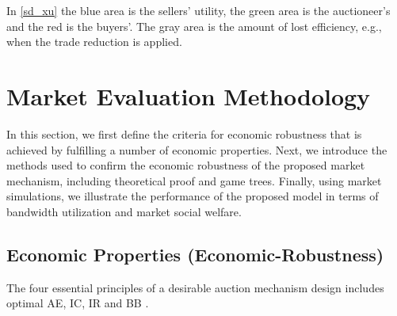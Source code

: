 \begin{enumerate}
In \autoref{sd_xu} the blue area is the sellers' utility, the green area is the auctioneer's and the red is the buyers'. The gray area is the amount of lost efficiency, e.g., when the trade reduction is applied.
\end{enumerate}






\section{Market Evaluation Methodology}
\label{sec:Auc:methodology}
In this section, we first define the criteria for economic robustness that is achieved by fulfilling a number of economic properties. Next, we introduce the methods used to confirm the economic robustness of the proposed market mechanism, including theoretical proof and game trees. Finally, using market simulations, we illustrate the performance of the proposed model in terms of bandwidth utilization and market social welfare.


\subsection {Economic Properties (Economic-Robustness)}
\label{Method:subsec:Economic-Robustness}
The four essential principles of a desirable auction mechanism design includes optimal \ac{AE}, \ac{IC}, \ac{IR} and \ac{BB} \cite{Krishna02}.

